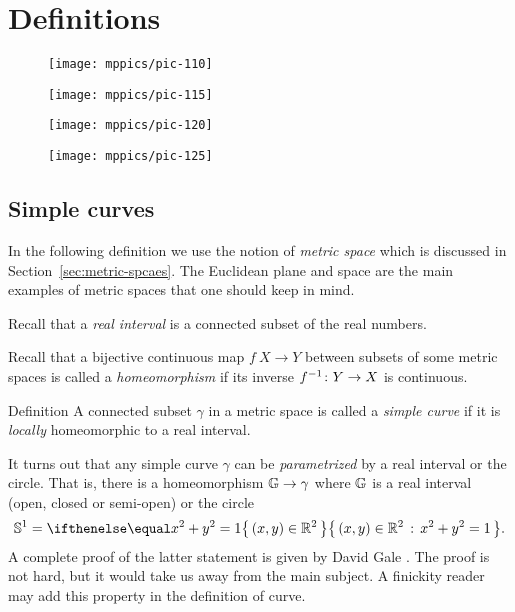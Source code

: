 \chapter{Definitions}

\vskip-10mm
\begin{figure}[h!]
\begin{minipage}{.48\textwidth}
\centering
\texttt{[image: mppics/pic-110]}
\end{minipage}\hfill
\begin{minipage}{.48\textwidth}
\centering
\texttt{[image: mppics/pic-115]}
\end{minipage}
\medskip
\begin{minipage}{.48\textwidth}
\centering
\texttt{[image: mppics/pic-120]}
\end{minipage}\hfill
\begin{minipage}{.48\textwidth}
\centering
\texttt{[image: mppics/pic-125]}
\end{minipage}
\end{figure}

\section{Simple curves}

In the following definition we use the notion of {}\emph{metric space} which is discussed in Section~\ref{sec:metric-spcaes}.
The Euclidean plane and space are the main examples of metric spaces that one should keep in mind.

Recall that a \emph{real interval} is a connected subset of the real numbers.

Recall that a bijective continuous map $f\:X\to Y$ between subsets of some metric spaces is called a {}\emph{homeomorphism} if its inverse $f^{-1}\:Y\z\to X$ is continuous.  

\begin{thm}{Definition} 
A connected subset $\gamma$ in a metric space is called a \emph{simple curve} if it is {}\emph{locally} homeomorphic to a real interval.
\end{thm}

It turns out that any simple curve $\gamma$ can be \emph{parametrized} by a real interval or the circle.
That is, there is a homeomorphism $\mathbb{G}\to\gamma$ 
where $\mathbb{G}$ is a real interval (open, closed or semi-open) or the circle
\[\mathbb{S}^1=\set{(x,y)\in\RR^2}{x^2+y^2=1}.\] 
A complete proof of the latter statement is given by David Gale \cite{gale}.
The proof is not hard, but it would take us away from the main subject.
A finickity reader may add this property in the definition of curve.


